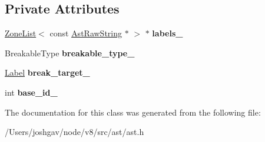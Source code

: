 \subsection*{Private Attributes}
\begin{DoxyCompactItemize}
\item 
\hyperlink{classv8_1_1internal_1_1_zone_list}{Zone\+List}$<$ const \hyperlink{classv8_1_1internal_1_1_ast_raw_string}{Ast\+Raw\+String} $\ast$ $>$ $\ast$ {\bfseries labels\+\_\+}\hypertarget{classv8_1_1internal_1_1_breakable_statement_a2e73a2bf55a002741ed0867a45e40917}{}\label{classv8_1_1internal_1_1_breakable_statement_a2e73a2bf55a002741ed0867a45e40917}

\item 
Breakable\+Type {\bfseries breakable\+\_\+type\+\_\+}\hypertarget{classv8_1_1internal_1_1_breakable_statement_ac49034efda61a32ff4412e4c8b341bb8}{}\label{classv8_1_1internal_1_1_breakable_statement_ac49034efda61a32ff4412e4c8b341bb8}

\item 
\hyperlink{classv8_1_1internal_1_1_label}{Label} {\bfseries break\+\_\+target\+\_\+}\hypertarget{classv8_1_1internal_1_1_breakable_statement_a428cbd9d02305da3ac889aae81acfed0}{}\label{classv8_1_1internal_1_1_breakable_statement_a428cbd9d02305da3ac889aae81acfed0}

\item 
int {\bfseries base\+\_\+id\+\_\+}\hypertarget{classv8_1_1internal_1_1_breakable_statement_a66db5125111a07ca54de0f482d8c9f55}{}\label{classv8_1_1internal_1_1_breakable_statement_a66db5125111a07ca54de0f482d8c9f55}

\end{DoxyCompactItemize}


The documentation for this class was generated from the following file\+:\begin{DoxyCompactItemize}
\item 
/\+Users/joshgav/node/v8/src/ast/ast.\+h\end{DoxyCompactItemize}
